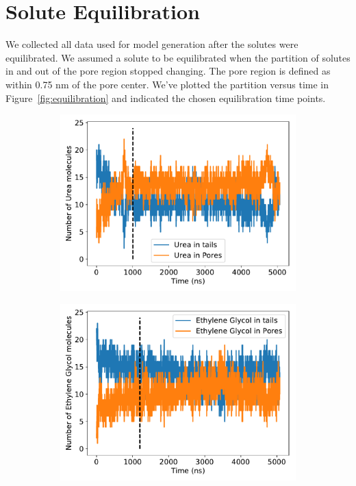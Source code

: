 \documentclass{article}
\begin{document}
  \section{Solute Equilibration}\label{section:equilibration}
  
  We collected all data used for model generation after the solutes were 
  equilibrated. We assumed a solute to be equilibrated when the partition of
  solutes in and out of the pore region stopped changing. The pore region is
  defined as within 0.75 nm of the pore center. We've plotted the partition
  versus time in Figure~\ref{fig:equilibration} and indicated the chosen
  equilibration time points.
  
  \begin{figure}
  \centering
  \begin{subfigure}{0.45\textwidth}
  \includegraphics[width=\textwidth]{URE_equilibration.pdf}
  \caption{}\label{fig:URE_equilibration}
  \end{subfigure}
  \begin{subfigure}{0.45\textwidth}
  \includegraphics[width=\textwidth]{GCL_equilibration.pdf}

\end{subfigure}
\end{figure}
\end{document}
